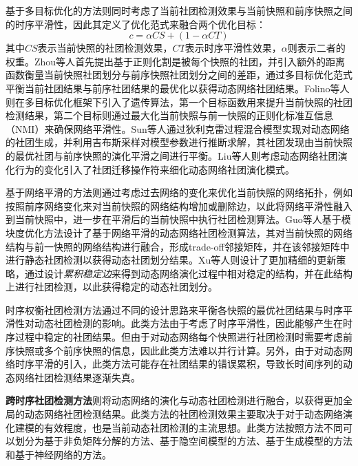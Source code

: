 基于多目标优化的方法则同时考虑了当前社团检测效果与当前快照和前序快照之间的时序平滑性，因此其定义了优化范式来融合两个优化目标：
\begin{equation}
c=\alpha CS+(1-\alpha CT)    
\end{equation}
其中$CS$表示当前快照的社团检测效果，$CT$表示时序平滑性效果，$\alpha$则表示二者的权重。Zhou等人\cite{zhou2007discovering}首先提出基于正则化割是被每个快照的社团，并引入额外的距离函数衡量当前快照社团划分与前序快照社团划分之间的差距，通过多目标优化范式平衡当前社团结果与前序社团结果的最优化以获得动态网络社团结果。Folino等人\cite{folino2013evolutionary}则在多目标优化框架下引入了遗传算法，第一个目标函数用来提升当前快照的社团检测结果，第二个目标则通过最大化当前快照与前一快照的正则化标准互信息（NMI）来确保网络平滑性。Sun等人\cite{sun2013co}通过狄利克雷过程混合模型实现对动态网络的社团生成，并利用吉布斯采样对模型参数进行推断求解，其社团发现由当前快照的最优社团与前序快照的演化平滑之间进行平衡。Liu等人\cite{liu2020detecting}则考虑动态网络社团演化行为的变化引入了社团迁移操作符来细化动态网络社团演化模式。

基于网络平滑的方法则通过考虑过去网络的变化来优化当前快照的网络拓扑，例如按照前序网络变化来对当前快照的网络结构增加或删除边，以此将网络平滑性融入到当前快照中，进一步在平滑后的当前快照中执行社团检测算法。Guo等人\cite{guo2014evolutionary}基于模块度优化方法设计了基于网络平滑的动态网络社团检测算法，其对当前快照的网络结构与前一快照的网络结构进行融合，形成trade-off邻接矩阵，并在该邻接矩阵中进行静态社团检测以获得动态社团划分结果。Xu等人\cite{xu2013community}则设计了更加精细的更新策略，通过设计\textit{累积稳定边}来得到动态网络演化过程中相对稳定的结构，并在此结构上进行社团检测，以此获得稳定的动态社团划分。

时序权衡社团检测方法通过不同的设计思路来平衡各快照的最优社团结果与时序平滑性对动态社团检测的影响。此类方法由于考虑了时序平滑性，因此能够产生在时序过程中稳定的社团结果。但由于对动态网络每个快照进行社团检测时需要考虑前序快照或多个前序快照的信息，因此此类方法难以并行计算。另外，由于对动态网络时序平滑的引入，此类方法可能存在社团结果的错误累积，导致长时间序列的动态网络社团检测结果逐渐失真。


\textbf{跨时序社团检测方法}则将动态网络的演化与动态社团检测进行融合，以获得更加全局的动态网络社团检测结果。此类方法的社团检测效果主要取决于对于动态网络演化建模的有效程度，也是当前动态社团检测的主流思想。此类方法按照方法不同可以划分为基于非负矩阵分解的方法、基于隐空间模型的方法、基于生成模型的方法和基于神经网络的方法。

